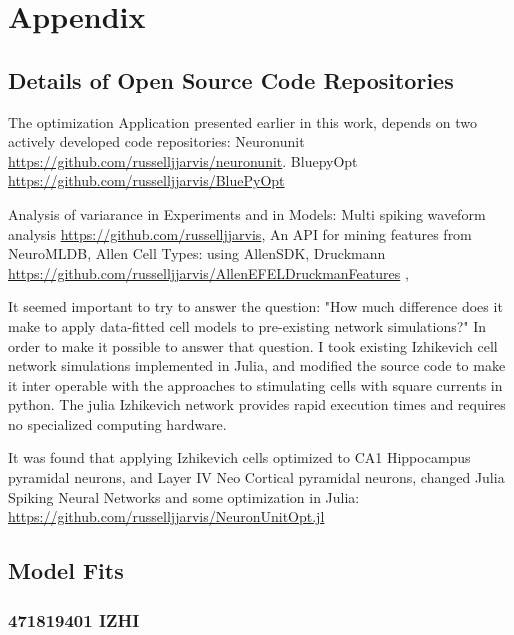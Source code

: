 \chapter{Appendix}

\section{Details of Open Source Code Repositories}
The optimization Application presented earlier in this work, depends on two actively developed code repositories:
Neuronunit \url{https://github.com/russelljjarvis/neuronunit}.
BluepyOpt \url{https://github.com/russelljjarvis/BluePyOpt}

Analysis of variarance in Experiments and in Models:
Multi spiking waveform analysis \url{https://github.com/russelljjarvis},
An API for mining features from NeuroMLDB, Allen Cell Types: using AllenSDK, Druckmann \url{https://github.com/russelljjarvis/AllenEFELDruckmanFeatures}
\cite{birgiolas2019towards}, \cite{birgiolas2016rapid} \cite{druckmann2007novel}

It seemed important to try to answer the question: "How much difference does it make to apply data-fitted cell models to pre-existing network simulations?" In order to make it possible to answer that question. I took existing Izhikevich cell network simulations implemented in Julia, and modified the source code to make it inter operable with the approaches to stimulating cells with square currents in python. The julia Izhikevich network provides rapid execution times and requires no specialized computing hardware.

It was found that applying Izhikevich cells optimized to CA1 Hippocampus pyramidal neurons, and Layer IV Neo Cortical pyramidal neurons, changed 
Julia Spiking Neural Networks and some optimization in Julia:
\url{https://github.com/russelljjarvis/NeuronUnitOpt.jl}

\section{Model Fits}
\subsection{471819401 IZHI}

